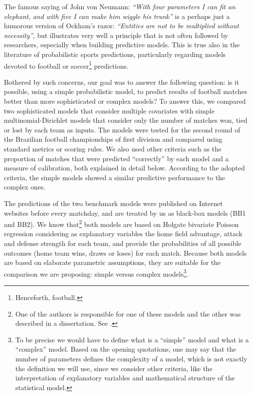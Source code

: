 \documentclass[journal,article,accept,moreauthors,pdftex,12pt,a4paper]{mdpi}
\begin{document}
The famous saying of John von Neumann: {\it ``With four parameters I can fit an elephant, and with five I can make him wiggle his trunk''} is a perhaps just a humorous version of Ockham's razor:
{\it``Entities are not to be multiplied without necessity''}, but illustrates very well a principle that is not often followed by researchers, especially when building predictive models.
This is true also in the literature of probabilistic sports predictions, particularly regarding models devoted to football or soccer\footnote{Henceforth, football.} predictions.

Bothered by such concerns, our goal was to answer the following question: is it possible, using a simple probabilistic model, to predict results of football matches better than more sophisticated or complex models?
To answer this, we compared two sophisticated models that consider multiple covariates with simple multinomial-Dirichlet models that consider only the number of matches won, tied or lost by each team as inputs.
The models were tested for the second round of the Brazilian football championships of first division and compared using standard metrics or scoring rules.
We also used other criteria such as the proportion of matches that were predicted ``correctly'' by each model and a measure of calibration, both explained in detail below.
According to the adopted criteria, the simple models showed a similar predictive performance to the complex ones.

The predictions of the two benchmark models were published on Internet websites before every matchday, and are treated by us as black-box models (BB1 and BB2). 
We know that\footnote{One of the authors is responsible for one of these models and the other was described in a dissertation. See \cite{arruda2000}.} both models are based on Holgate bivariate Poisson regression considering as explanatory variables the home field advantage, attack and defense strength for each team, and provide the probabilities of all possible outcomes (home team wins, draws or loses) for each match.
Because both models are based on elaborate parametric assumptions, they are suitable for the comparison we are proposing: simple versus complex models\footnote{To be precise we would have to define what is a ``simple'' model and what is a ``complex'' model. Based on the opening quotations, one may say that the number of parameters defines the complexity of a model, which is not exactly the definition we will use, since we consider other criteria, like the interpretation of explanatory variables and mathematical structure of the statistical model.}.
\end{document}
